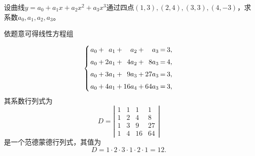 \begin{frame}

\begin{li}
  设曲线$y=a_0+a_1x + a_2 x^2 + a_3 x^3$通过四点$(1,3), (2,4), (3,3), (4,-3)$，求系数$a_0,a_1,a_2,a_3$。
\end{li} \pause 
\begin{jie}
  依题意可得线性方程组

  $$
  \setlength{\arraycolsep}{1.0pt}
  \left\{
    \begin{array}{rcrcrcrcr}
      a_0 & + &  a_1 & + &  a_2 & + &   a_3 & = & 3, \\[0.2cm]
      a_0 & + & 2a_1 & + & 4a_2 & + &  8a_3 & = & 4, \\[0.2cm]
      a_0 & + & 3a_1 & + & 9a_3 & + & 27a_3 & = & 3, \\[0.2cm]
      a_0 & + & 4a_1 & + &16a_4 & + & 64a_3 & = & 3,
    \end{array}
  \right.
  $$
  其系数行列式为
  $$
  D = \left|
    \begin{array}{rrrr}
      1 & 1 &  1 &  1 \\
      1 & 2 &  4 &  8 \\
      1 & 3 &  9 & 27 \\
      1 & 4 & 16 & 64
    \end{array}
  \right|
  $$
  是一个范德蒙德行列式，其值为
  $$ 
  D = 1\cdot 2 \cdot 3 \cdot 1 \cdot 2 \cdot 1 = 12.
  $$
\end{jie}

\end{frame}

